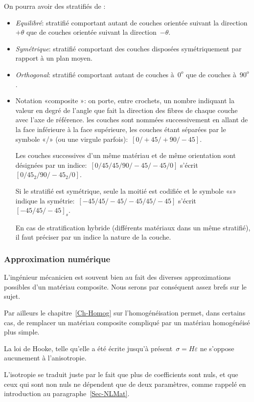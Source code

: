 \medskip
On pourra avoir des stratifiés de :
\begin{itemize}
	\item \emph{Equilibré}: stratifié comportant autant de couches orientée suivant la direction $+\theta$ que de couches orientée suivant la direction~$-\theta$.
	\item \emph{Symétrique}: stratifié comportant des couches disposées symétriquement par
		 rapport à un plan moyen.
	\item \emph{Orthogonal}: stratifié comportant autant de couches à~$0^o$ que de couches à~$90^o$.
	\item Notation «composite »:
		on porte, entre crochets, un nombre indiquant la valeur en degré de l'angle que fait la direction des fibres de chaque couche avec l'axe de référence. les couches sont nommées successivement en allant de la face inférieure à la face supérieure, les couches étant séparées par le symbole «/» (ou une virgule parfois):~$[0/+45/+90/-45]$.

		Les couches successives d'un même matériau et de même orientation sont désignées par un indice:~$[0/45/45/90/-45/-45/0]$ s'écrit~$[0/45_2/90/-45_2/0]$.
		
		Si le stratifié est symétrique, seule la moitié est codifiée et le symbole «s» indique la symétrie:~$[-45/45/-45/-45/45/-45]$ s'écrit~$[-45/45/-45]_s$.

		En cas de stratification hybride (différents matériaux dans un même stratifié), il faut préciser par un indice la nature de la couche.
\end{itemize}


\medskip
\subsubsection{Approximation numérique}

L'ingénieur mécanicien est souvent bien au fait des diverses approximations possibles d'un matériau composite. Nous serons par conséquent assez brefs sur le sujet.

Par ailleurs le chapitre~\ref{Ch-Homog} sur l'homogénéisation permet, dans certains cas, de remplacer un matériau composite compliqué par un matériau homogénéisé plus simple.

\medskip
La loi de Hooke, telle qu'elle a été écrite jusqu'à présent~$\sigma=H\varepsilon$ ne s'oppose aucunement à l'anisotropie.

L'isotropie se traduit juste par le fait que plus de coefficients sont nuls, et que ceux qui sont non nuls ne dépendent que de deux paramètres, comme rappelé en introduction au paragraphe~\ref{Sec-NLMat}.

